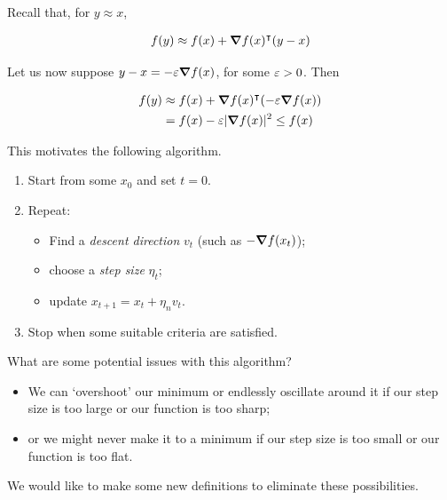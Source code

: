 \documentclass{../../template/note}
\begin{document}
    Recall that, for \(y \approx x\),

    \begin{align*}
        f(y) \approx f(x) + \grad f(x)^\intercal (y-x)
    \end{align*}
    
    Let us now suppose $y-x = -\eps\grad f(x)$, for some $\varepsilon > 0$. Then

    \begin{align*}
        f(y) &\approx f(x) + \grad f(x)^\intercal (-\eps \grad f(x)) \\
        &= f(x) - \eps |\grad f(x)|^2 \leq f(x)
    \end{align*}
    
    This motivates the following algorithm.

    \begin{algorithm}
        \begin{enumerate}[label=\protect\circled{\arabic*}]
            \item Start from some $x_0$ and set $t=0$.
            \item Repeat:
            \begin{itemize}
                \item Find a \emph{descent direction} $v_t$ (such as $-\grad f(x_t)$);
                \item choose a \emph{step size} $\eta_t$;
                \item update $x_{t+1} = x_t + \eta_n v_t$.
            \end{itemize}
            \item Stop when some suitable criteria are satisfied.
        \end{enumerate}
    \end{algorithm}
    
    What are some potential issues with this algorithm?

    \begin{itemize}
        \item We can `overshoot' our minimum or endlessly oscillate around it if our step size is too large or our function is too sharp;
        \item or we might never make it to a minimum if our step size is too small or our function is too flat.
    \end{itemize}
    
    We would like to make some new definitions to eliminate these possibilities.
\end{document}
